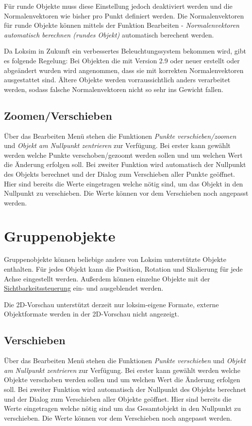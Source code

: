 Für runde Objekte muss diese Einstellung jedoch deaktiviert werden und die Normalenvektoren wie bisher pro Punkt definiert werden. Die Normalenvektoren für runde Objekte können mittels der Funktion Bearbeiten - \emph{Normalenvektoren automatisch berechnen (rundes Objekt)} automatisch berechent werden.

Da Loksim in Zukunft ein verbessertes Beleuchtungssystem bekommen wird, gibt es folgende Regelung: Bei Objekten die mit Version 2.9 oder neuer erstellt oder abgeändert wurden wird angenommen, dass sie mit korrekten Normalenvektoren ausgestattet sind. Ältere Objekte werden vorraussichtlich anders verarbeitet werden, sodass falsche Normalenvektoren nicht so sehr ins Gewicht fallen.

\subsection{Zoomen/Verschieben}
\label{sec:editor-obj-l3dobj-punkteverschieben}
Über das Bearbeiten Menü stehen die Funktionen \emph{Punkte verschieben/zoomen} und \emph{Objekt am Nullpunkt zentrieren} zur Verfügung. Bei erster kann gewählt werden welche Punkte verschoben/gezoomt werden sollen und um welchen Wert die Änderung erfolgen soll. Bei zweiter Funktion wird automatisch der Nullpunkt des Objekts berechnet und der Dialog zum Verschieben aller Punkte geöffnet. Hier sind bereits die Werte eingetragen welche nötig sind, um das Objekt in den Nullpunkt zu verschieben. Die Werte können vor dem Verschieben noch angepasst werden.

\section{Gruppenobjekte}
\label{sec:editor-obj-grp}
Gruppenobjekte können beliebige andere von Loksim unterstützte Objekte enthalten. Für jedes Objekt kann die Position, Rotation und Skalierung für jede Achse eingestellt werden. Außerdem können einzelne Objekte mit der \hyperref[sec:editor-obj-sichtbarkeitssteuerung]{Sichtbarkeitssteuerung} ein- und ausgeblendet werden.

Die 2D-Vorschau unterstützt derzeit nur loksim-eigene Formate, externe Objektformate werden in der 2D-Vorschau nicht angezeigt.
\subsection{Verschieben}
\label{sec:editor-obj-grp-verschieben}
Über das Bearbeiten Menü stehen die Funktionen \emph{Punkte verschieben} und \emph{Objekt am Nullpunkt zentrieren} zur Verfügung. Bei erster kann gewählt werden welche Objekte verschoben werden sollen und um welchen Wert die Änderung erfolgen soll. Bei zweiter Funktion wird automatisch der Nullpunkt des Objekts berechnet und der Dialog zum Verschieben aller Objekte geöffnet. Hier sind bereits die Werte eingetragen welche nötig sind um das Gesamtobjekt in den Nullpunkt zu verschieben. Die Werte können vor dem Verschieben noch angepasst werden.


